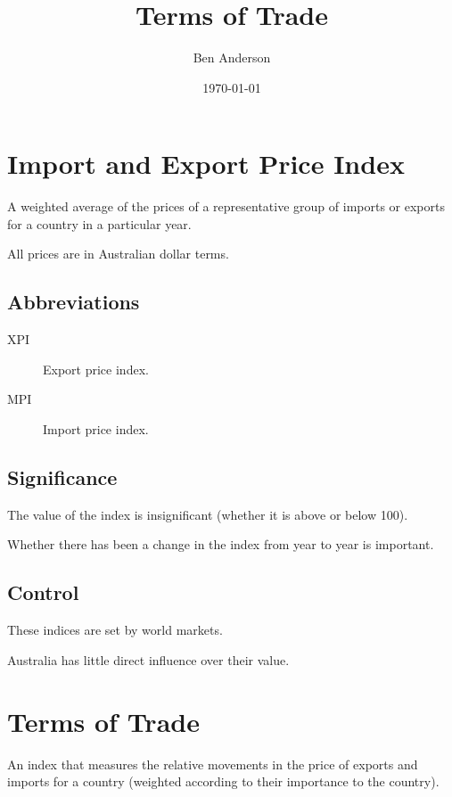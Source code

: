 \documentclass[a4paper,11pt]{article}
\begin{document}
\title{Terms of Trade}
\author{Ben Anderson}
\date{\today}
\maketitle
\pagebreak

\tableofcontents
\pagebreak


\section{Import and Export Price Index}

A weighted average of the prices of a representative group of imports or
exports for a country in a particular year.

All prices are in Australian dollar terms.


\subsection{Abbreviations}

\begin{description}
\item [XPI] Export price index.
\item [MPI] Import price index.
\end{description}


\subsection{Significance}

The value of the index is insignificant (whether it is above or below 100).

Whether there has been a change in the index from year to year is important.


\subsection{Control}

These indices are set by world markets.

Australia has little direct influence over their value.




\section{Terms of Trade}

An index that measures the relative movements in the price of exports and
imports for a country (weighted according to their importance to the country).
\end{document}
